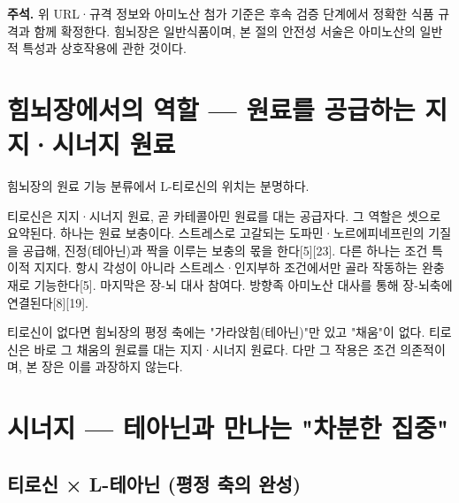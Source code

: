 \documentclass[12pt,oneside]{book}
\newenvironment{authnote}
  {\par\smallskip\begingroup\leftskip=6mm\rightskip=3mm\small\color{muted}\noindent\ignorespaces}
  {\par\endgroup\smallskip}
\begin{document}
\begin{authnote}\textbf{주석.} 위 URL·규격 정보와 아미노산 첨가 기준은 후속 검증 단계에서 정확한 식품 규격과 함께 확정한다. 힘뇌장은 일반식품이며, 본 절의 안전성 서술은 아미노산의 일반적 특성과 상호작용에 관한 것이다.\end{authnote}

\section{힘뇌장에서의 역할 — 원료를 공급하는 지지·시너지 원료}

힘뇌장의 원료 기능 분류에서 L-티로신의 위치는 분명하다.

\vspace{2pt}\vspace{3pt}

티로신은 지지·시너지 원료, 곧 카테콜아민 원료를 대는 공급자다. 그 역할은 셋으로 요약된다. 하나는 원료 보충이다. 스트레스로 고갈되는 도파민·노르에피네프린의 기질을 공급해, 진정(테아닌)과 짝을 이루는 보충의 몫을 한다[5][23]. 다른 하나는 조건 특이적 지지다. 항시 각성이 아니라 스트레스·인지부하 조건에서만 골라 작동하는 완충재로 기능한다[5]. 마지막은 장-뇌 대사 참여다. 방향족 아미노산 대사를 통해 장-뇌축에 연결된다[8][19].

티로신이 없다면 힘뇌장의 평정 축에는 "가라앉힘(테아닌)"만 있고 "채움"이 없다. 티로신은 바로 그 채움의 원료를 대는 지지·시너지 원료다. 다만 그 작용은 조건 의존적이며, 본 장은 이를 과장하지 않는다.

\section{시너지 — 테아닌과 만나는 "차분한 집중"}

\subsection{티로신 × L-테아닌 (평정 축의 완성)}
\end{document}
